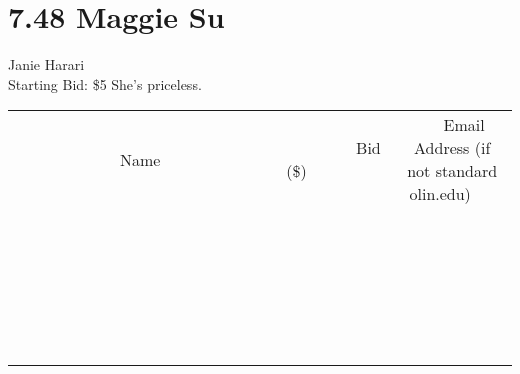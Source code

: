\documentclass[11pt]{article}
\begin{document}
\section*{7.48 Maggie Su}
Janie Harari
\\
Starting Bid: \$5
\newline
She's priceless.
\\[6ex]
\begin{tabular}{c c c}
~~~~~~~~~~~~~Name~~~~~~~~~~~~~ & ~~~~~~~~~Bid (\$)~~~~~~~~~  & ~~~Email Address (if not standard olin.edu)~~~\\
 & & \\
\hline
 & & \\
\hline
 & & \\
\hline
 & & \\
\hline
 & & \\
\hline
 & & \\
\hline
 & & \\
\hline
 & & \\
\hline
 & & \\
\hline
 & & \\
\hline
 & & \\
\hline
 & & \\
\hline
 & & \\
\hline
 & & \\
\hline
 & & \\
\hline
 & & \\
\hline
 & & \\
\hline
 & & \\
\hline
 & & \\
\hline
 & & \\
\hline
 & & \\
\hline
 & & \\
\hline
 & & \\
\hline
 & & \\
\hline
 & & \\
\hline
 & & \\
\hline
\end{tabular}
\newpage
\end{document}
